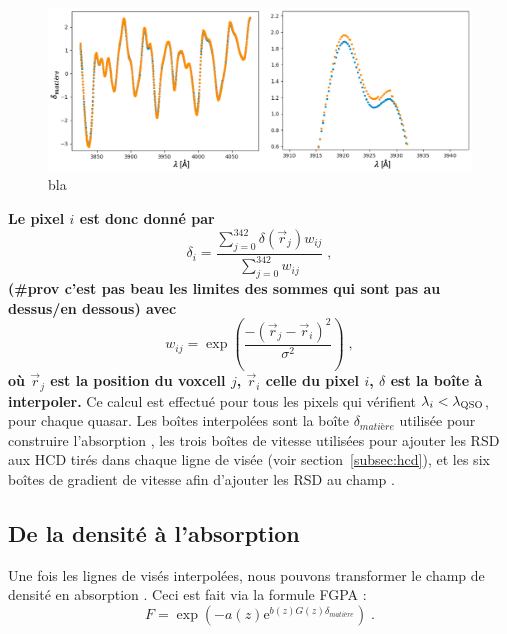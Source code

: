 \documentclass[11pt, twoside, a4paper, openright]{report}
\begin{document}
\begin{figure}
  \centering
  \includegraphics[scale=0.4]{smoothing23}
  \caption{bla}
  \label{fig:smoothing23}
\end{figure}
\textbf{Le pixel $i$ est donc donné par
\begin{equation}
  \delta_i = \frac{
    \sum_{j=0}^{342} \delta(\vec r_j) w_{ij}
  }{
    \sum_{j=0}^{342} w_{ij}
  } \; ,
\end{equation}
(\#prov c'est pas beau les limites des sommes qui sont pas au dessus/en dessous)
avec
\begin{equation}
  w_{ij} = \exp(\frac{
    -(\vec r_j - \vec r_i)^2
  }{
    \sigma^2
  }) \; ,
\end{equation}
où $\vec r_j$ est la position du voxcell $j$, $\vec r_i$ celle du pixel $i$, $\delta$ est la boîte à interpoler.
}
Ce calcul est effectué pour tous les pixels qui vérifient $\lambda_i < \lambda_{\textsc{QSO}}$, pour chaque quasar. Les boîtes interpolées sont la boîte $\delta_{matière}$ utilisée pour construire l'absorption \lya{}, les trois boîtes de vitesse utilisées pour ajouter les RSD aux HCD tirés dans chaque ligne de visée (voir section~\ref{subsec:hcd}), et les six boîtes de gradient de vitesse afin d'ajouter les RSD au champ \lya{}.


\subsection{De la densité à l'absorption}
Une fois les lignes de visés interpolées, nous pouvons transformer le champ de densité en absorption \lya{}. Ceci est fait via la formule FGPA :
\begin{equation}
  \label{eq:fgpa2}
F = \exp( - a(z) \mathrm{e}^{b(z) G(z) \delta_{matière}}) \;.  
\end{equation}
\end{document}

